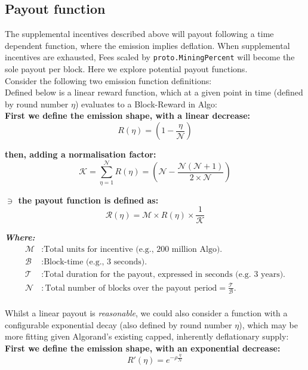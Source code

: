 \documentclass[11pt,a4paper]{article}
\begin{document}
\pagebreak

\subsection{Payout function}
The supplemental incentives described above will payout following a time dependent function, where the emission implies 
deflation. When supplemental incentives are exhausted, Fees scaled by \texttt{proto.MiningPercent} will become the sole 
payout per block. Here we explore potential payout functions. \\

Consider the following two emission function definitions: \\

Defined below is a linear reward function, which at a given point in time (defined by round number $\eta$) evaluates to 
a \gls{Block-Reward} in Algo:\\

\textbf{First we define the emission shape, with a linear decrease:}
\[
R(\eta) = (1- \frac{\eta}{\mathcal{N}})
\]

\textbf{then, adding a normalisation factor:}
\[
\mathcal{K} = \sum_{\eta=1}^\mathcal{N}R(\eta)=(\mathcal{N} -  \frac{\mathcal{N}(\mathcal{N}+1)}{2\times \mathcal{N}})  
\]

\textbf{$\ni$ the payout function is defined as:}
\[
\mathcal{R}(\eta) = \mathcal{M} \times R(\eta) \times \frac{1}{\mathcal{K}}
\]

\textbf{\emph{Where:}}
\begin{align*}
    \mathcal{M} & : \text{Total units for incentive (e.g., 200 million Algo).} \\
    \mathcal{B} & : \text{Block-time (e.g., 3 seconds).} \\
    \mathcal{T} & : \text{Total duration for the payout, expressed in seconds (e.g. 3 years).} \\
    \mathcal{N} & : \text{Total number of blocks over the payout period} = \frac{\mathcal{T}}{\mathcal{B}}.\\
\end{align*}

Whilst a linear payout is \textit{reasonable}, we could also consider a function with a configurable exponential decay 
(also defined by round number $\eta$), which may be more fitting given Algorand's existing capped, inherently 
deflationary supply: \\ 

\textbf{First we define the emission shape, with an exponential decrease:}
\[
R'(\eta)= e^{-\rho\frac{\eta}{\mathcal{N}}}
\]
\end{document}

